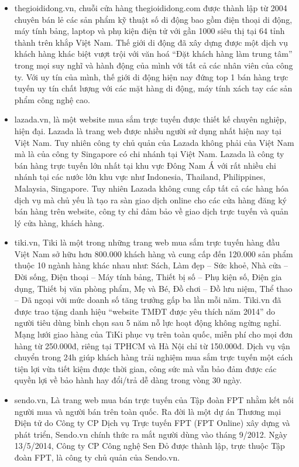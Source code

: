 \begin{itemize}
\item	thegioididong.vn, chuỗi cửa hàng thegioididong.com được thành lập từ 2004 chuyên bán lẻ các sản phẩm kỹ thuật số di động bao gồm điện thoại di động, máy tính bảng, laptop và phụ kiện điện tử với gần 1000 siêu thị tại 64 tỉnh thành trên khắp Việt Nam. Thế giới di động đã xây dựng được một dịch vụ khách hàng khác biệt vượt trội với văn hoá “Đặt khách hàng làm trung tâm” trong mọi suy nghĩ và hành động của mình với tất cả các nhân viên của công ty. Với uy tín của mình, thế giới di động hiện nay đứng top 1 bán hàng trực tuyến uy tín chất lượng với các mặt hàng di động, máy tính xách tay các sản phẩm công nghệ cao.
\item	lazada.vn, là một website mua sắm trực tuyến được thiết kế chuyên nghiệp, hiện đại. Lazada là trang web được nhiều người sử dụng nhất hiện nay tại Việt Nam. Tuy nhiên công ty chủ quản của Lazada không phải của Việt Nam mà là của công ty Singapore có chi nhánh tại Việt Nam. Lazada là công ty bán hàng trực tuyến lớn nhất tại khu vực Đông Nam Á với rất nhiều chi nhánh tại các nước lớn khu vực như Indonesia, Thailand, Philippines, Malaysia, Singapore. Tuy nhiên Lazada không cung cấp tất cả các hàng hóa dịch vụ mà chủ yếu là tạo ra sàn giao dịch online cho các cửa hàng đăng ký bán hàng trên website, công ty chỉ đảm bảo về giao dịch trực tuyến và quản lý cửa hàng, khách hàng.
\item	tiki.vn, Tiki là một trong những trang web mua sắm trực tuyến hàng đầu Việt Nam sở hữu hơn 800.000 khách hàng và cung cấp đến 120.000 sản phẩm thuộc 10 ngành hàng khác nhau như: Sách, Làm đẹp – Sức khoẻ, Nhà cửa – Đời sống, Điện thoại – Máy tính bảng, Thiết bị số – Phụ kiện số, Điện gia dụng, Thiết bị văn phòng phẩm, Mẹ và Bé, Đồ chơi – Đồ lưu niệm, Thể thao – Dã ngoại với mức doanh số tăng trưởng gấp ba lần mỗi năm. Tiki.vn đã được trao tặng danh hiệu “website TMĐT được yêu thích năm 2014” do người tiêu dùng bình chọn sau 5 năm nỗ lực hoạt động không ngừng nghỉ. Mạng lưới giao hàng của TiKi phục vụ trên toàn quốc, miễn phí cho mọi đơn hàng từ 250.000đ, riêng tại TPHCM và Hà Nội chỉ từ 150.000đ. Dịch vụ vận chuyển trong 24h giúp khách hàng trải nghiệm mua sắm trực tuyến một cách tiện lợi vừa tiết kiệm được thời gian, công sức mà vẫn bảo đảm được các quyền lợi về bảo hành hay đổi/trả dễ dàng trong vòng 30 ngày.
\item sendo.vn, Là trang web mua bán trực tuyến của Tập đoàn FPT nhằm kết nối người mua và người bán trên toàn quốc. Ra đời là một dự án Thương mại Điện tử do Công ty CP Dịch vụ Trực tuyến FPT (FPT Online) xây dựng và phát triển, Sendo.vn chính thức ra mắt người dùng vào tháng 9/2012. Ngày 13/5/2014, Công ty CP Công nghệ Sen Đỏ được thành lập, trực thuộc Tập đoàn FPT, là công ty chủ quản của Sendo.vn.

\end{itemize}
